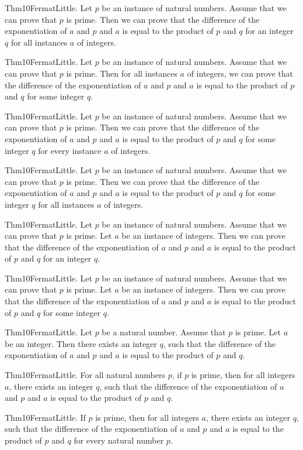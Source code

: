 \documentclass{article}
\begin{document}
Thm10FermatLittle. Let $p$ be an instance of natural numbers. Assume that we can prove that $p$ is prime. Then we can prove that the difference of the exponentiation of $a$ and $p$ and $a$ is equal to the product of $p$ and $q$ for an integer $q$ for all instances $a$ of integers.

Thm10FermatLittle. Let $p$ be an instance of natural numbers. Assume that we can prove that $p$ is prime. Then for all instances $a$ of integers, we can prove that the difference of the exponentiation of $a$ and $p$ and $a$ is equal to the product of $p$ and $q$ for some integer $q$.

Thm10FermatLittle. Let $p$ be an instance of natural numbers. Assume that we can prove that $p$ is prime. Then we can prove that the difference of the exponentiation of $a$ and $p$ and $a$ is equal to the product of $p$ and $q$ for some integer $q$ for every instance $a$ of integers.

Thm10FermatLittle. Let $p$ be an instance of natural numbers. Assume that we can prove that $p$ is prime. Then we can prove that the difference of the exponentiation of $a$ and $p$ and $a$ is equal to the product of $p$ and $q$ for some integer $q$ for all instances $a$ of integers.

Thm10FermatLittle. Let $p$ be an instance of natural numbers. Assume that we can prove that $p$ is prime. Let $a$ be an instance of integers. Then we can prove that the difference of the exponentiation of $a$ and $p$ and $a$ is equal to the product of $p$ and $q$ for an integer $q$.

Thm10FermatLittle. Let $p$ be an instance of natural numbers. Assume that we can prove that $p$ is prime. Let $a$ be an instance of integers. Then we can prove that the difference of the exponentiation of $a$ and $p$ and $a$ is equal to the product of $p$ and $q$ for some integer $q$.

Thm10FermatLittle. Let $p$ be a natural number. Assume that $p$ is prime. Let $a$ be an integer. Then there exists an integer $q$, such that the difference of the exponentiation of $a$ and $p$ and $a$ is equal to the product of $p$ and $q$.

Thm10FermatLittle. For all natural numbers $p$, if $p$ is prime, then for all integers $a$, there exists an integer $q$, such that the difference of the exponentiation of $a$ and $p$ and $a$ is equal to the product of $p$ and $q$.

Thm10FermatLittle. If $p$ is prime, then for all integers $a$, there exists an integer $q$, such that the difference of the exponentiation of $a$ and $p$ and $a$ is equal to the product of $p$ and $q$ for every natural number $p$.
\end{document}
